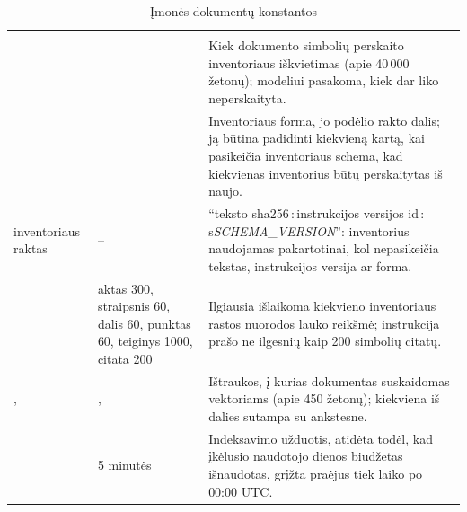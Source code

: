 \begin{xltabular}{\textwidth}{@{}L{44mm}L{19mm}Y@{}}
\caption{Įmonės dokumentų konstantos}\label{tab:config:documents}\\
\toprule
{} &  &  \\
\midrule
\endfirsthead
\toprule
{} &  &  \\
\midrule
\endhead
\bottomrule
\endlastfoot
{} &  & Kiek dokumento simbolių perskaito inventoriaus iškvietimas (apie 40\,000 žetonų); modeliui pasakoma, kiek dar liko neperskaityta. \\
 &  & Inventoriaus forma, jo podėlio rakto dalis; ją būtina padidinti kiekvieną kartą, kai pasikeičia inventoriaus schema, kad kiekvienas inventorius būtų perskaitytas iš naujo. \\
inventoriaus raktas & -- & \enquote{teksto sha256\,:\,instrukcijos versijos id\,:\,s\textit{SCHEMA\_VERSION}}: inventorius naudojamas pakartotinai, kol nepasikeičia tekstas, instrukcijos versija ar forma. \\
 & aktas 300, straipsnis 60, dalis 60, punktas 60, teiginys 1000, citata 200 & Ilgiausia išlaikoma kiekvieno inventoriaus rastos nuorodos lauko reikšmė; instrukcija prašo ne ilgesnių kaip 200 simbolių citatų. \\
,  & ,  & Ištraukos, į kurias dokumentas suskaidomas vektoriams (apie 450 žetonų); kiekviena iš dalies sutampa su ankstesne. \\
 & 5 minutės & Indeksavimo užduotis, atidėta todėl, kad įkėlusio naudotojo dienos biudžetas išnaudotas, grįžta praėjus tiek laiko po 00:00 UTC. \\
\end{xltabular}


